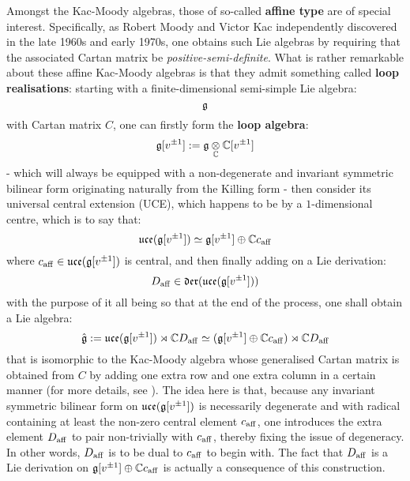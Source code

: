         Amongst the Kac-Moody algebras, those of so-called \textbf{affine type} are of special interest. Specifically, as Robert Moody and Victor Kac independently discovered in the late 1960s and early 1970s, one obtains such Lie algebras by requiring that the associated Cartan matrix be \textit{positive-semi-definite}. What is rather remarkable about these affine Kac-Moody algebras is that they admit something called \textbf{loop realisations}: starting with a finite-dimensional semi-simple Lie algebra:
            $$\mathfrak{g}$$
        with Cartan matrix $C$, one can firstly form the \textbf{loop algebra}:
            $$\g[v^{\pm 1}] := \g \tensor_{\bbC} \bbC[v^{\pm 1}]$$
        - which will always be equipped with a non-degenerate and invariant symmetric bilinear form originating naturally from the Killing form - then consider its universal central extension (UCE), which happens to be by a $1$-dimensional centre, which is to say that:
            $$\mathfrak{uce}(\mathfrak{g}[v^{\pm 1}]) \simeq \mathfrak{g}[v^{\pm 1}] \oplus \mathbb{C} c_{\mathrm{aff}}$$
        where $c_{\mathrm{aff}} \in \mathfrak{uce}(\mathfrak{g}[v^{\pm 1}])$ is central, and then finally adding on a Lie derivation:
            $$D_{\mathrm{aff}} \in \mathfrak{der}( \mathfrak{uce}(\mathfrak{g}[v^{\pm 1}]) )$$
        with the purpose of it all being so that at the end of the process, one shall obtain a Lie algebra:
            $$\hat{\mathfrak{g}} := \mathfrak{uce}(\mathfrak{g}[v^{\pm 1}]) \rtimes \mathbb{C} D_{\mathrm{aff}} \simeq (\mathfrak{g}[v^{\pm 1}] \oplus \mathbb{C} c_{\mathrm{aff}}) \rtimes \mathbb{C} D_{\mathrm{aff}}$$
        that is isomorphic to the Kac-Moody algebra whose generalised Cartan matrix is obtained from $C$ by adding one extra row and one extra column in a certain manner (for more details, see \cite[Chapter 7]{kac_infinite_dimensional_lie_algebras}). The idea here is that, because any invariant symmetric bilinear form on $\mathfrak{uce}(\mathfrak{g}[v^{\pm 1}])$ is necessarily degenerate and with radical containing at least the non-zero central element $c_{\mathrm{aff}}$, one introduces the extra element $D_{\mathrm{aff}}$ to pair non-trivially with $c_{\mathrm{aff}}$, thereby fixing the issue of degeneracy. In other words, $D_{\mathrm{aff}}$ is to be dual to $c_{\mathrm{aff}}$ to begin with. The fact that $D_{\mathrm{aff}}$ is a Lie derivation on $\mathfrak{g}[v^{\pm 1}] \oplus \mathbb{C} c_{\mathrm{aff}}$ is actually a consequence of this construction.

